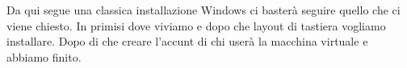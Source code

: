 \documentclass[../main.tex]{subfiles}
\begin{document}
Da qui segue una classica installazione Windows ci basterà seguire quello che ci viene chiesto. In primisi dove viviamo e dopo che layout di tastiera vogliamo installare. Dopo di che creare l'accunt di chi userà la macchina virtuale e abbiamo finito.
\end{document}
